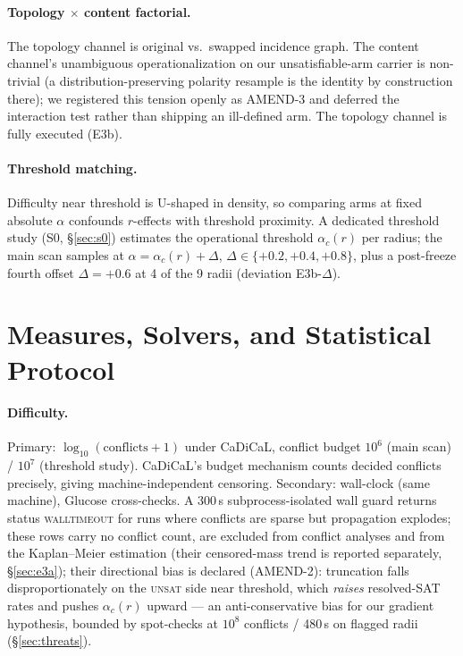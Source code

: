 \documentclass[11pt]{article}
\newcommand{\ac}[1]{\ensuremath{\alpha_c(#1)}}
\begin{document}
\paragraph{Topology $\times$ content factorial.}
The topology channel is original vs.\ swapped incidence graph. The content
channel's unambiguous operationalization on our unsatisfiable-arm carrier is
non-trivial (a distribution-preserving polarity resample is the identity by
construction there); we registered this tension openly as AMEND-3 and deferred
the interaction test rather than shipping an ill-defined arm. The topology
channel is fully executed (E3b).

\paragraph{Threshold matching.}
Difficulty near threshold is U-shaped in density, so comparing arms at fixed
absolute $\alpha$ confounds $r$-effects with threshold proximity. A dedicated
threshold study (S0, \S\ref{sec:s0}) estimates the operational threshold
$\ac{r}$ per radius; the main scan samples at $\alpha = \ac{r} + \Delta$,
$\Delta \in \{+0.2, +0.4, +0.8\}$, plus a post-freeze fourth offset
$\Delta{=}{+}0.6$ at 4 of the 9 radii (deviation E3b-$\Delta$).

\section{Measures, Solvers, and Statistical Protocol}
\label{sec:method}

\paragraph{Difficulty.}
Primary: $\log_{10}(\text{conflicts}+1)$ under CaDiCaL, conflict budget
$10^6$ (main scan) / $10^7$ (threshold study). CaDiCaL's budget mechanism
counts decided conflicts precisely, giving machine-independent censoring.
Secondary: wall-clock (same machine), Glucose cross-checks. A 300\,s
subprocess-isolated wall guard returns status \textsc{walltimeout} for runs
where conflicts are sparse but propagation explodes; these rows carry no
conflict count, are excluded from conflict analyses and from the
Kaplan--Meier estimation (their censored-mass trend is reported separately,
\S\ref{sec:e3a}); their directional bias is declared (AMEND-2):
truncation falls disproportionately on the \textsc{unsat} side near
threshold, which \emph{raises} resolved-SAT rates and pushes $\ac{r}$ upward
--- an anti-conservative bias for our gradient hypothesis, bounded by
spot-checks at $10^8$ conflicts / 480\,s on flagged radii
(\S\ref{sec:threats}).
\end{document}
